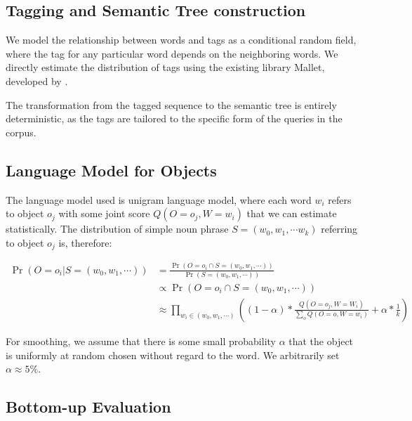 \documentclass[letterpaper,10pt]{article}
\begin{document}

\subsection{Tagging and Semantic Tree construction}

We model the relationship between words and tags as a conditional random field, where the tag for any particular word depends on the neighboring words. We directly estimate the distribution of tags using the existing library Mallet, developed by \citet{McCallumMALLET}.

The transformation from the tagged sequence to the semantic tree is entirely deterministic, as the tags are tailored to the specific form of the queries in the corpus.

\subsection{Language Model for Objects}
\label{sec:langmod_obj}

The language model used is unigram language model, where each word $w_i$ refers to object $o_j$ with some joint score $Q(O = o_j, W = w_i)$ that we can estimate statistically. 
The distribution of simple noun phrase $S = (w_0, w_1, \cdots w_k)$ referring to object $o_j$ is, therefore:

\begin{align*}
	\Pr(O = o_i | S = (w_0, w_1, \cdots)) & = \frac{\Pr(O = o_i \cap S = (w_0, w_1, \cdots ))}{\Pr(S = (w_0, w_1, \cdots))}
\\ & \propto \Pr(O = o_i \cap S = (w_0, w_1, \cdots))
\\ & \approx \prod_{w_i \in (w_0, w_1, \cdots)} \left( (1 - \alpha) * \frac{Q(O = o_j, W = W_i)}{\sum_{o} Q(O = o, W = w_i)} + \alpha * \frac{1}{k} \right)
\end{align*}

For smoothing, we assume that there is some small probability $\alpha$ that the object is uniformly at random chosen without regard to the word. We arbitrarily set $\alpha \approx 5\%$.

\subsection{Bottom-up Evaluation}
\end{document}
